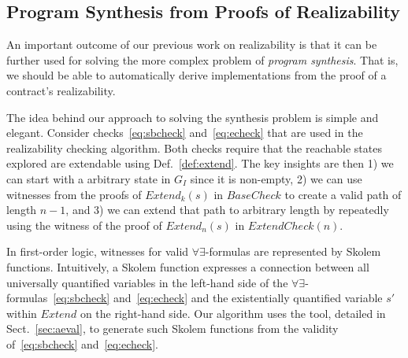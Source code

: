 \subsection{Program Synthesis from Proofs of Realizability}

An important outcome of our previous work on realizability is that it
can be further used for solving the more complex problem of
\emph{program synthesis}. That is, we should be able to automatically
derive implementations from the proof of a contract's realizability.

The idea behind our approach to solving the synthesis problem is
simple and elegant. Consider checks~\eqref{eq:sbcheck}
and~\eqref{eq:echeck} that are used in the realizability checking
algorithm. Both checks require that the reachable states explored are
extendable using Def.~\ref{def:extend}. The key insights are then 1)
we can start with a arbitrary state in $G_I$ since it is non-empty, 2)
we can use witnesses from the proofs of $\mathit{Extend}_k(s)$ in
$\mathit{BaseCheck}$ to create a valid path of length $n-1$, and 3) we
can extend that path to arbitrary length by repeatedly using the
witness of the proof of $\mathit{Extend}_n(s)$ in
$\mathit{ExtendCheck}(n)$.

In first-order logic, witnesses for valid $\forall\exists$-formulas
are represented by Skolem functions. Intuitively, a Skolem function
expresses a connection between all universally quantified variables in
the left-hand side of the $\forall\exists$-formulas~\eqref{eq:sbcheck}
and~\eqref{eq:echeck} and the existentially quantified variable $s'$
within $\mathit{Extend}$ on the right-hand side. Our algorithm uses
the \aeval tool, detailed in Sect.~\ref{sec:aeval}, to generate such
Skolem functions from the validity of~\eqref{eq:sbcheck}
and~\eqref{eq:echeck}.



